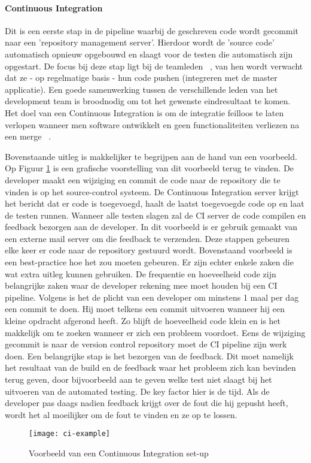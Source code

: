         \paragraph{Continuous Integration}
        Dit is een eerste stap in de pipeline waarbij de geschreven code wordt gecommit naar een 'repository management server'. Hierdoor wordt de 'source code' automatisch opnieuw opgebouwd en slaagt voor de testen die automatisch zijn opgestart. De focus bij deze stap ligt bij de teamleden ~\autocite{Fowler2006}, van hen wordt verwacht dat ze - op regelmatige basis - hun code pushen (integreren met de master applicatie). Een goede samenwerking tussen de verschillende leden van het development team is broodnodig om tot het gewenste eindresultaat te komen.
        Het doel van een Continuous Integration is om de integratie feilloos te laten verlopen wanneer men software ontwikkelt en geen functionaliteiten verliezen na een merge ~\autocite{Riti2018}.
        
        Bovenstaande uitleg is makkelijker te begrijpen aan de hand van een voorbeeld. Op Figuur \ref{img-ci-example} is een grafische voorstelling van dit voorbeeld terug te vinden.
        De developer maakt een wijziging en commit de code naar de repository die te vinden is op het source-control systeem. De Continuous Integration server krijgt het bericht dat er code is toegevoegd, haalt de laatst toegevoegde code op en laat de testen runnen. Wanneer alle testen slagen zal de CI server de code compilen en feedback bezorgen aan de developer. In dit voorbeeld is er gebruik gemaakt van een externe mail server om die feedback te verzenden.
        Deze stappen gebeuren elke keer er code naar de repository gestuurd wordt.
        Bovenstaand voorbeeld is een best-practice hoe het zou moeten gebeuren. Er zijn echter enkele zaken die wat extra uitleg kunnen gebruiken.
        De frequentie en hoeveelheid code zijn belangrijke zaken waar de developer rekening mee moet houden bij een CI pipeline. Volgens \textcite{Fowler2006} is het de plicht van een developer om minstens 1 maal per dag een commit te doen. Hij moet telkens een commit uitvoeren wanneer hij een kleine opdracht afgerond heeft. Zo blijft de hoeveelheid code klein en is het makkelijk om te zoeken wanneer er zich een probleem voordoet.
        Eens de wijziging gecommit is naar de version control repository moet de CI pipeline zijn werk doen. Een belangrijke stap is het bezorgen van de feedback. Dit moet namelijk het resultaat van de build en de feedback waar het probleem zich kan bevinden terug geven, door bijvoorbeeld aan te geven welke test niet slaagt bij het uitvoeren van de automated testing. De key factor hier is de tijd. Als de developer pas daags nadien feedback krijgt over de fout die hij gepusht heeft, wordt het al moeilijker om de fout te vinden en ze op te lossen. 
        \begin{figure}	
            \texttt{[image: ci-example]}
            \caption{Voorbeeld van een Continuous Integration set-up ~\autocite{Riti2018}} \label{img-ci-example}
        \end{figure}
    
